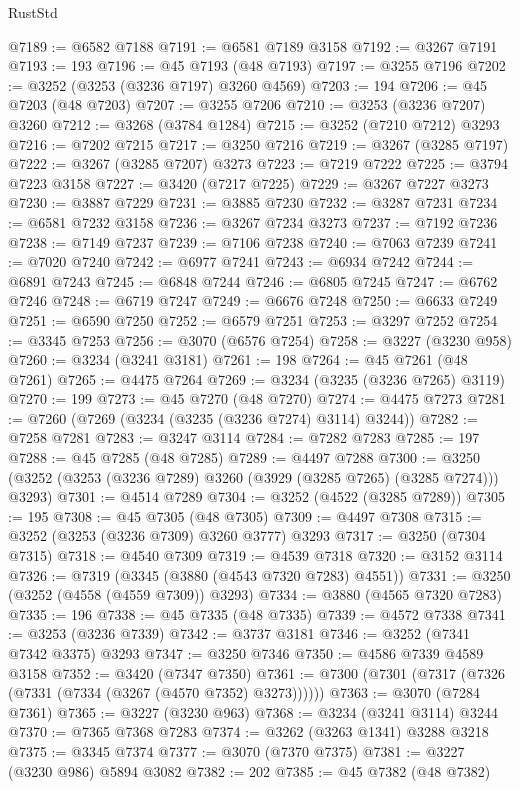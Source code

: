 \begin{lexlean}{RustStd}
\begin{coremodule}
{\begin{coremodule}
{{{{{{{{{{{{{{{{{{{{{{{{{{{{{{{{{{{{{{{@7189 := @6582 @7188
@7191 := @6581 @7189 @3158
@7192 := @3267 @7191
@7193 := 193
@7196 := @45 @7193 (@48 @7193)
@7197 := @3255 @7196
@7202 := @3252 (@3253 (@3236 @7197) @3260 @4569)
@7203 := 194
@7206 := @45 @7203 (@48 @7203)
@7207 := @3255 @7206
@7210 := @3253 (@3236 @7207) @3260
@7212 := @3268 (@3784 @1284)
@7215 := @3252 (@7210 @7212) @3293
@7216 := @7202 @7215
@7217 := @3250 @7216
@7219 := @3267 (@3285 @7197)
@7222 := @3267 (@3285 @7207) @3273
@7223 := @7219 @7222
@7225 := @3794 @7223 @3158
@7227 := @3420 (@7217 @7225)
@7229 := @3267 @7227 @3273
@7230 := @3887 @7229
@7231 := @3885 @7230
@7232 := @3287 @7231
@7234 := @6581 @7232 @3158
@7236 := @3267 @7234 @3273
@7237 := @7192 @7236
@7238 := @7149 @7237
@7239 := @7106 @7238
@7240 := @7063 @7239
@7241 := @7020 @7240
@7242 := @6977 @7241
@7243 := @6934 @7242
@7244 := @6891 @7243
@7245 := @6848 @7244
@7246 := @6805 @7245
@7247 := @6762 @7246
@7248 := @6719 @7247
@7249 := @6676 @7248
@7250 := @6633 @7249
@7251 := @6590 @7250
@7252 := @6579 @7251
@7253 := @3297 @7252
@7254 := @3345 @7253
@7256 := @3070 (@6576 @7254)
@7258 := @3227 (@3230 @958)
@7260 := @3234 (@3241 @3181)
@7261 := 198
@7264 := @45 @7261 (@48 @7261)
@7265 := @4475 @7264
@7269 := @3234 (@3235 (@3236 @7265) @3119)
@7270 := 199
@7273 := @45 @7270 (@48 @7270)
@7274 := @4475 @7273
@7281 := @7260 (@7269 (@3234 (@3235 (@3236 @7274) @3114) @3244))
@7282 := @7258 @7281
@7283 := @3247 @3114
@7284 := @7282 @7283
@7285 := 197
@7288 := @45 @7285 (@48 @7285)
@7289 := @4497 @7288
@7300 := @3250 (@3252 (@3253 (@3236 @7289) @3260 (@3929 (@3285 @7265) (@3285 @7274))) @3293)
@7301 := @4514 @7289
@7304 := @3252 (@4522 (@3285 @7289))
@7305 := 195
@7308 := @45 @7305 (@48 @7305)
@7309 := @4497 @7308
@7315 := @3252 (@3253 (@3236 @7309) @3260 @3777) @3293
@7317 := @3250 (@7304 @7315)
@7318 := @4540 @7309
@7319 := @4539 @7318
@7320 := @3152 @3114
@7326 := @7319 (@3345 (@3880 (@4543 @7320 @7283) @4551))
@7331 := @3250 (@3252 (@4558 (@4559 @7309)) @3293)
@7334 := @3880 (@4565 @7320 @7283)
@7335 := 196
@7338 := @45 @7335 (@48 @7335)
@7339 := @4572 @7338
@7341 := @3253 (@3236 @7339)
@7342 := @3737 @3181
@7346 := @3252 (@7341 @7342 @3375) @3293
@7347 := @3250 @7346
@7350 := @4586 @7339 @4589 @3158
@7352 := @3420 (@7347 @7350)
@7361 := @7300 (@7301 (@7317 (@7326 (@7331 (@7334 (@3267 (@4570 @7352) @3273))))))
@7363 := @3070 (@7284 @7361)
@7365 := @3227 (@3230 @963)
@7368 := @3234 (@3241 @3114) @3244
@7370 := @7365 @7368 @7283
@7374 := @3262 (@3263 @1341) @3288 @3218
@7375 := @3345 @7374
@7377 := @3070 (@7370 @7375)
@7381 := @3227 (@3230 @986) @5894 @3082
@7382 := 202
@7385 := @45 @7382 (@48 @7382)
}}}}}}}}}}}}}}}}}}}}}}}}}}}}}}}}}}}}}}}
\end{coremodule}}
\end{coremodule}
\end{lexlean}
